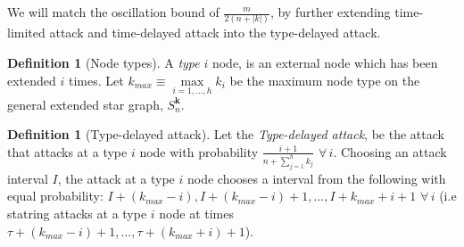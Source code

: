 \documentclass[a4paper,10pt]{article}
\newcommand{\denominator}{\ensuremath{n+\sum\limits_{j=1}^{h} k_{j}}}
\theoremstyle{definition}
\newtheorem{definition}[theorem]{Definition}
\theoremstyle{definition}
\theoremstyle{remark}
\theoremstyle{definition}
\begin{document}
We will match the oscillation bound of $\frac{m}{2(n+|k|)}$, by further extending time-limited attack and time-delayed attack into the type-delayed attack.

\begin{definition}[Node types]
A \textit{type} $i$ node, is an external node which has been extended $i$ times. Let $k_{max} \equiv \max\limits_{i=1,...,h} k_{i}$ be the maximum node type on the general extended star graph, $S_{n}^{\bm{k}}$.
\end{definition}

\begin{definition}[Type-delayed attack]
Let  the \textit{Type-delayed attack}, be the attack that attacks at a type $i$ node with probability $\frac{i+1}{\denominator}$ $\forall \, i$. Choosing an attack interval $I$, the attack at a type $i$ node chooses a interval from the following with equal probability: $I+(k_{max}-i),I+(k_{max}-i)+1,...,I+k_{max}+i+1$ $\forall \, i$ (i.e statring attacks at a type $i$ node at times $\tau+(k_{max}-i)+1,...,\tau+(k_{max}+i)+1$).
\end{definition}
\end{document}
